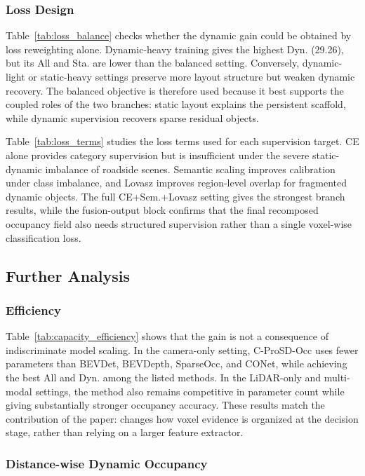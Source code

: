 \subsubsection{Loss Design}
Table~\ref{tab:loss_balance} checks whether the dynamic gain could be obtained
by loss reweighting alone. Dynamic-heavy training gives the highest Dyn.
(29.26), but its All and Sta. are lower than the balanced setting. Conversely,
dynamic-light or static-heavy settings preserve more layout structure but
weaken dynamic recovery. The balanced objective is therefore used because it
best supports the coupled roles of the two branches: static layout explains the
persistent scaffold, while dynamic supervision recovers sparse residual
objects.

Table~\ref{tab:loss_terms} studies the loss terms used for each supervision
target. CE alone provides category supervision but is insufficient under the
severe static-dynamic imbalance of roadside scenes. Semantic scaling improves
calibration under class imbalance, and Lovasz improves region-level overlap for
fragmented dynamic objects. The full CE+Sem.+Lovasz setting gives the strongest
branch results, while the fusion-output block confirms that the final
recomposed occupancy field also needs structured supervision rather than a
single voxel-wise classification loss.

\subsection{Further Analysis}
\subsubsection{Efficiency}

Table~\ref{tab:capacity_efficiency} shows that the gain is not a consequence
of indiscriminate model scaling. In the camera-only setting, C-ProSD-Occ uses
fewer parameters than BEVDet, BEVDepth, SparseOcc, and CONet, while achieving
the best All and Dyn. among the listed methods. In the LiDAR-only and
multi-modal settings, the method also remains competitive in parameter count
while giving substantially stronger occupancy accuracy. These results match the
contribution of the paper: \nameplus{} changes how voxel evidence is organized
at the decision stage, rather than relying on a larger feature extractor.

\subsubsection{Distance-wise Dynamic Occupancy}

